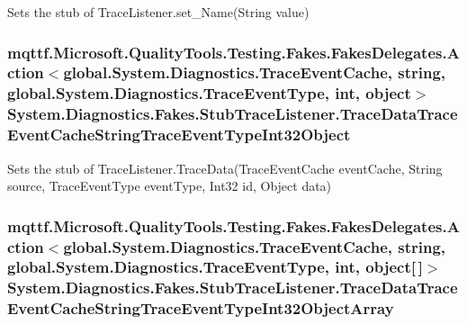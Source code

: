 Sets the stub of Trace\-Listener.\-set\-\_\-\-Name(\-String value)

\hypertarget{class_system_1_1_diagnostics_1_1_fakes_1_1_stub_trace_listener_a82d0f11fd4114061151999fdae01e0cf}{
\subsubsection[{Trace\-Data\-Trace\-Event\-Cache\-String\-Trace\-Event\-Type\-Int32\-Object}]{\setlength{\rightskip}{0pt plus 5cm}mqttf.\-Microsoft.\-Quality\-Tools.\-Testing.\-Fakes.\-Fakes\-Delegates.\-Action$<$global.\-System.\-Diagnostics.\-Trace\-Event\-Cache, string, global.\-System.\-Diagnostics.\-Trace\-Event\-Type, int, object$>$ System.\-Diagnostics.\-Fakes.\-Stub\-Trace\-Listener.\-Trace\-Data\-Trace\-Event\-Cache\-String\-Trace\-Event\-Type\-Int32\-Object}}\label{class_system_1_1_diagnostics_1_1_fakes_1_1_stub_trace_listener_a82d0f11fd4114061151999fdae01e0cf}


Sets the stub of Trace\-Listener.\-Trace\-Data(\-Trace\-Event\-Cache event\-Cache, String source, Trace\-Event\-Type event\-Type, Int32 id, Object data)

\hypertarget{class_system_1_1_diagnostics_1_1_fakes_1_1_stub_trace_listener_a8a281b1d7af9de41ad26d018036092e8}{
\subsubsection[{Trace\-Data\-Trace\-Event\-Cache\-String\-Trace\-Event\-Type\-Int32\-Object\-Array}]{\setlength{\rightskip}{0pt plus 5cm}mqttf.\-Microsoft.\-Quality\-Tools.\-Testing.\-Fakes.\-Fakes\-Delegates.\-Action$<$global.\-System.\-Diagnostics.\-Trace\-Event\-Cache, string, global.\-System.\-Diagnostics.\-Trace\-Event\-Type, int, object\mbox{[}$\,$\mbox{]}$>$ System.\-Diagnostics.\-Fakes.\-Stub\-Trace\-Listener.\-Trace\-Data\-Trace\-Event\-Cache\-String\-Trace\-Event\-Type\-Int32\-Object\-Array}}\label{class_system_1_1_diagnostics_1_1_fakes_1_1_stub_trace_listener_a8a281b1d7af9de41ad26d018036092e8}


